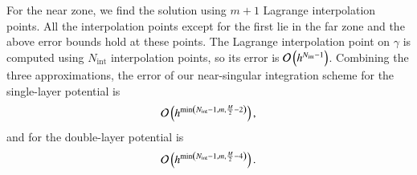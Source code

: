 For the near zone, we find the solution using $m+1$ Lagrange
interpolation points.  All the interpolation points except for the
first lie in the far zone and the above error bounds hold at these
points.  The Lagrange interpolation point on $\gamma$ is computed
using $N_{\mathrm{int}}$ interpolation points, so its error is
$\mathcal{O}\left(h^{N_{\mathrm{int}}-1}\right)$.  Combining the three
approximations, the error of our near-singular integration scheme for
the single-layer potential is
\begin{align*}
  \mathcal{O}\left(h^{\min\left(N_{\mathrm{int}}-1,m,\frac{M}{2}-2\right)}\right),
\end{align*}
and for the double-layer potential is
\begin{align*}
  \mathcal{O}\left(h^{\min\left(N_{\mathrm{int}}-1,m,\frac{M}{2}-4\right)}\right).
\end{align*}



